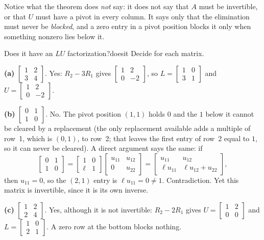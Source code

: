 \documentclass[11pt]{article}
\begin{document}
Notice what the theorem does \emph{not} say: it does not say that $A$ must be invertible, or that $U$ must have a pivot in every column. It says only that the elimination must never be \emph{blocked}, and a zero entry in a pivot position blocks it only when something nonzero lies below it.

\begin{exmp}{Does it have an $LU$ factorization?}{doesit}
Decide for each matrix.

\textbf{(a)} $\begin{bmatrix}1&2\\3&4\end{bmatrix}$. Yes: $R_2-3R_1$ gives $\begin{bmatrix}1&2\\0&-2\end{bmatrix}$, so $L=\begin{bmatrix}1&0\\3&1\end{bmatrix}$ and $U=\begin{bmatrix}1&2\\0&-2\end{bmatrix}$.

\textbf{(b)} $\begin{bmatrix}0&1\\1&0\end{bmatrix}$. No. The pivot position $(1,1)$ holds $0$ and the $1$ below it cannot be cleared by a replacement (the only replacement available adds a multiple of row~1, which is $(0,1)$, to row~2; that leaves the first entry of row~2 equal to $1$, so it can never be cleared). A direct argument says the same: if
\[
\begin{bmatrix}0&1\\1&0\end{bmatrix}=\begin{bmatrix}1&0\\\ell&1\end{bmatrix}\begin{bmatrix}u_{11}&u_{12}\\0&u_{22}\end{bmatrix}=\begin{bmatrix}u_{11}&u_{12}\\\ell u_{11}&\ell u_{12}+u_{22}\end{bmatrix},
\]
then $u_{11}=0$, so the $(2,1)$ entry is $\ell u_{11}=0\neq1$. Contradiction. Yet this matrix is invertible, since it is its own inverse.

\textbf{(c)} $\begin{bmatrix}1&2\\2&4\end{bmatrix}$. Yes, although it is not invertible: $R_2-2R_1$ gives $U=\begin{bmatrix}1&2\\0&0\end{bmatrix}$ and $L=\begin{bmatrix}1&0\\2&1\end{bmatrix}$. A zero row at the bottom blocks nothing.


\end{exmp}
\end{document}
